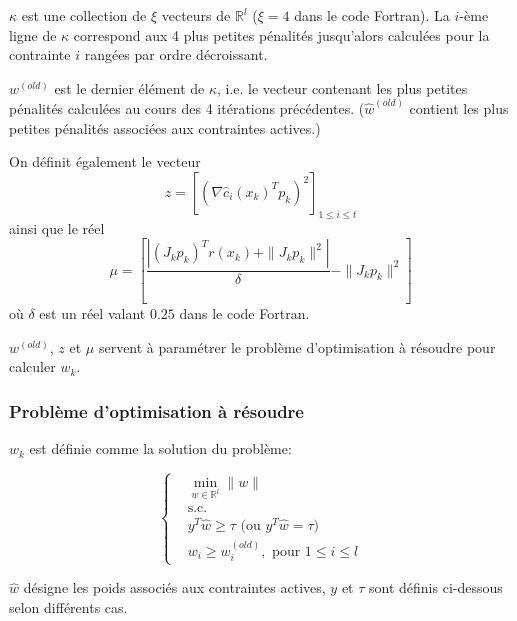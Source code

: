 \documentclass[a4paper,11pt]{article}
\newcommand{\real}{\mathbb{R}}
\newcommand{\hc}{\hat{c}}
\numberwithin{equation}{section}
\begin{document}
$\kappa$ est une collection de $\xi$ vecteurs de $\real^{l}$ ($\xi=4$ dans le code Fortran). La $i$-ème ligne de $\kappa$ correspond aux 4 plus petites pénalités jusqu'alors calculées pour la contrainte $i$ rangées par ordre décroissant. 

$w^{(old)}$ est le dernier élément de $\kappa$, i.e. le vecteur contenant les plus petites pénalités calculées au cours des 4 itérations précédentes. ($\hat{w}^{(old)}$ contient les plus petites pénalités associées aux contraintes actives.)

On définit également le vecteur $$z=\left[(\nabla \hc_i(x_{k})^Tp_{k})^2 \right]_{1 \leq i \leq t}$$ ainsi que le réel $$\mu =  \left[\dfrac{|(J_{k}p_{k})^Tr(x_k) + \|J_{k}p_{k}\|^2|}{\delta} - \|J_{k}p_{k}\|^2 \right]$$ où $\delta$ est un réel valant $0.25$ dans le code Fortran. 

$w^{(old)}$, $z$ et $\mu$ servent à paramétrer le problème d'optimisation à résoudre pour calculer $w_{k}$.

\subsubsection{Problème d'optimisation à résoudre}

$w_{k}$ est définie comme la solution du problème: 

\begin{equation}
\left\{ \begin{aligned} 
&\underset{w \in \real^{l}}{\min} \|w\| \\
&\text{s.c.}\\
&y^{T}\hat{w} \geq \tau \text{ (ou } y^{T}\hat{w} = \tau)\\
&w_i \geq w_i^{(old)}, \text{ pour } 1 \leq i \leq l
\end{aligned}\right.
\end{equation}

$\hat{w}$ désigne les poids associés aux contraintes actives, $y$ et $\tau$ sont définis ci-dessous selon différents cas.
\end{document}
